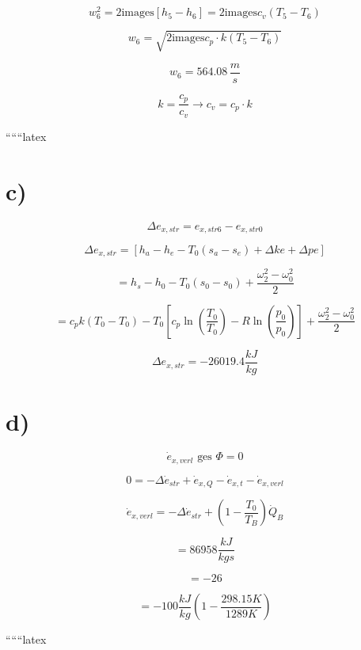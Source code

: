 \[
w_6^2 = 2 \text{images} \left[ h_5 - h_6 \right] = 2 \text{images} c_v (T_5 - T_6)
\]

\[
w_6 = \sqrt{2 \text{images} c_p \cdot k (T_5 - T_6)}
\]

\[
w_6 = 564.08 \, \frac{m}{s}
\]

\[
k = \frac{c_p}{c_v} \rightarrow c_v = c_p \cdot k
\]

``````latex

\section*{c)}

\[
\Delta e_{x,str} = e_{x,str6} - e_{x,str0}
\]

\[
\Delta e_{x,str} = \left[ h_a - h_e - T_0(s_a - s_e) + \Delta ke + \Delta pe \right]
\]

\[
= h_s - h_0 - T_0(s_0 - s_0) + \frac{\omega_2^2 - \omega_0^2}{2}
\]

\[
= c_p k(T_0 - T_0) - T_0 \left[ c_p \ln \left( \frac{T_0}{T_0} \right) - R \ln \left( \frac{p_0}{p_0} \right) \right] + \frac{\omega_2^2 - \omega_0^2}{2}
\]

\[
\Delta e_{x,str} = -26019.4 \frac{kJ}{kg}
\]

\section*{d)}

\[
\dot{e}_{x,verl} \text{ ges } \Phi = 0
\]

\[
0 = -\Delta \dot{e}_{str} + \dot{e}_{x,Q} - \dot{e}_{x,t} - \dot{e}_{x,verl}
\]

\[
\dot{e}_{x,verl} = -\Delta \dot{e}_{str} + \left( 1 - \frac{T_0}{T_B} \right) \dot{Q}_B
\]

\[
= 86958 \frac{kJ}{kg s}
\]

\[
= -26
\]

\[
= -100 \frac{kJ}{kg} \left( 1 - \frac{298.15 K}{1289 K} \right)
\]

``````latex


